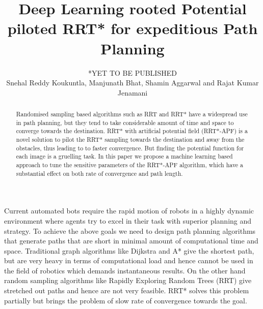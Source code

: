 \documentclass[runningheads]{llncs}
\begin{document}
%
\title{Deep Learning rooted Potential piloted RRT* for expeditious Path Planning}
%
%
\author{
*YET TO BE PUBLISHED \inst{*} \\Snehal Reddy Koukuntla\inst{*}, Manjunath Bhat\inst{*}, Shamin Aggarwal \inst{*} and Rajat Kumar Jenamani}
%
%
%
\maketitle              %
%
\begin{abstract}
Randomised sampling based algorithms such as RRT and RRT* have a widespread use in path planning, but they tend to take considerable amount of time and space to converge towards the destination. RRT* with artificial potential field (RRT*-APF) is a novel solution to pilot the RRT* sampling towards the destination and away from the obstacles, thus leading to to faster convergence. But finding the potential function for each image is a gruelling task. In this paper we propose a machine learning based approach to tune the sensitive parameters of the RRT*-APF algorithm, which have a substantial effect on both rate of convergence and path length. 

\end{abstract}
%
%
%
\section{}
Current automated bots require the rapid motion of robots in a highly dynamic environment where agents try to excel in their task with superior planning and strategy. To achieve the above goals we need to design path planning algorithms that generate paths that are short in minimal amount of computational time and space. Traditional graph algorithms like Dijkstra and A* give the shortest path, but are very heavy in terms of computational load and hence cannot be used in the field of robotics which demands instantaneous results. On the other hand random sampling algorithms like Rapidly Exploring Random Trees (RRT) give stretched out paths and hence are not very feasible. RRT* solves this problem partially but brings the problem of slow rate of convergence towards the goal. 
\end{document}
